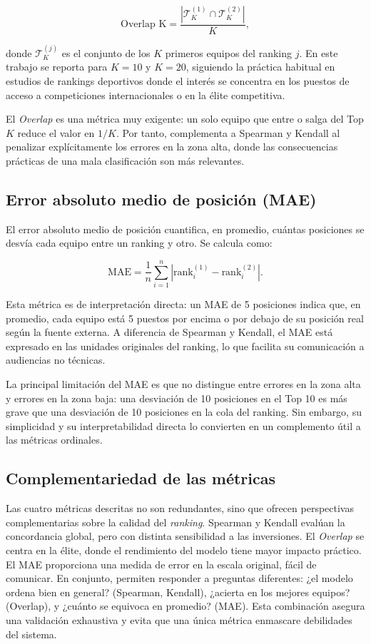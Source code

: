 \[
\text{Overlap K} = \frac{|\mathcal{T}_K^{(1)} \cap \mathcal{T}_K^{(2)}|}{K},
\]

donde \(\mathcal{T}_K^{(j)}\) es el conjunto de los \(K\) primeros equipos del ranking \(j\). En este trabajo se reporta para \(K = 10\) y \(K = 20\), siguiendo la pr\'actica habitual en estudios de rankings deportivos donde el inter\'es se concentra en los puestos de acceso a competiciones internacionales o en la \'elite competitiva.

El \textit{Overlap} es una m\'etrica muy exigente: un solo equipo que entre o salga del Top \(K\) reduce el valor en \(1/K\). Por tanto, complementa a Spearman y Kendall al penalizar expl\'icitamente los errores en la zona alta, donde las consecuencias pr\'acticas de una mala clasificaci\'on son m\'as relevantes.

\subsection{Error absoluto medio de posici\'on (MAE)}

El error absoluto medio de posici\'on cuantifica, en promedio, cu\'antas posiciones se desv\'ia cada equipo entre un ranking y otro. Se calcula como:

\[
\text{MAE} = \frac{1}{n}\sum_{i=1}^{n} |\text{rank}_i^{(1)} - \text{rank}_i^{(2)}|.
\]

Esta m\'etrica es de interpretaci\'on directa: un MAE de 5 posiciones indica que, en promedio, cada equipo est\'a 5 puestos por encima o por debajo de su posici\'on real seg\'un la fuente externa. A diferencia de Spearman y Kendall, el MAE est\'a expresado en las unidades originales del ranking, lo que facilita su comunicaci\'on a audiencias no t\'ecnicas.

La principal limitaci\'on del MAE es que no distingue entre errores en la zona alta y errores en la zona baja: una desviaci\'on de 10 posiciones en el Top 10 es m\'as grave que una desviaci\'on de 10 posiciones en la cola del ranking. Sin embargo, su simplicidad y su interpretabilidad directa lo convierten en un complemento \'util a las m\'etricas ordinales.

\subsection{Complementariedad de las m\'etricas}

Las cuatro m\'etricas descritas no son redundantes, sino que ofrecen perspectivas complementarias sobre la calidad del \textit{ranking}. Spearman y Kendall eval\'uan la concordancia global, pero con distinta sensibilidad a las inversiones. El \textit{Overlap} se centra en la \'elite, donde el rendimiento del modelo tiene mayor impacto pr\'actico. El MAE proporciona una medida de error en la escala original, f\'acil de comunicar. En conjunto, permiten responder a preguntas diferentes: ¿el modelo ordena bien en general? (Spearman, Kendall), ¿acierta en los mejores equipos? (Overlap), y ¿cu\'anto se equivoca en promedio? (MAE). Esta combinaci\'on asegura una validaci\'on exhaustiva y evita que una \'unica m\'etrica enmascare debilidades del sistema.

